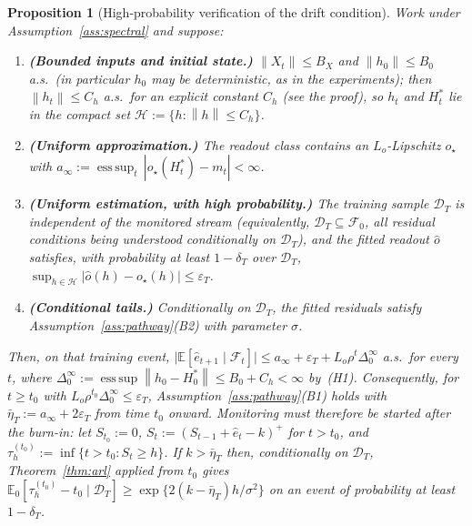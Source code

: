 \documentclass[bj,authoryear]{imsart}
\theoremstyle{plain}
\newtheorem{proposition}[theorem]{Proposition}
\theoremstyle{definition}
\newcommand{\E}{\mathbb{E}}
\newcommand{\F}{\mathcal{F}}
\newcommand{\norm}[1]{\left\lVert #1 \right\rVert}
\newcommand{\given}{\mid}
\begin{document}
\begin{proposition}[High-probability verification of the drift condition]
\label{prop:hp-drift}
  Work under Assumption~\ref{ass:spectral} and suppose:
  \begin{enumerate}[label=(H\arabic*), itemsep=2pt]
    \item \textbf{(Bounded inputs and initial state.)}  $\norm{X_t}\le B_X$ and
      $\norm{h_0}\le B_0$ a.s.\ (in particular $h_0$ may be deterministic, as in
      the experiments); then $\norm{h_t}\le C_h$ a.s.\ for an explicit constant
      $C_h$ (see the proof), so $h_t$ and $H_t^*$ lie in the compact set
      $\mathcal H:=\{h:\norm{h}\le C_h\}$.
    \item \textbf{(Uniform approximation.)}  The readout class contains an
      $L_o$-Lipschitz $o_\star$ with
      $a_\infty:=\operatorname*{ess\,sup}_t\,|o_\star(H_t^*)-m_t|<\infty$.
    \item \textbf{(Uniform estimation, with high probability.)}  The training
      sample $\mathcal D_T$ is independent of the monitored stream (equivalently,
      $\mathcal D_T\subseteq\F_0$, all residual conditions being understood
      conditionally on $\mathcal D_T$), and the fitted readout $\hat o$
      satisfies, with probability at least $1-\delta_T$ over $\mathcal D_T$,
      $\sup_{h\in\mathcal H}|\hat o(h)-o_\star(h)|\le\varepsilon_T$.
    \item \textbf{(Conditional tails.)}  Conditionally on $\mathcal D_T$, the
      fitted residuals satisfy Assumption~\ref{ass:pathway}(B2) with parameter
      $\sigma$.
  \end{enumerate}
  Then, on that training event,
  $\bigl|\E[\hat e_{t+1}\given\F_t]\bigr|
   \le a_\infty+\varepsilon_T+L_o\rho^{t}\Delta_0^\infty$ a.s.\ for every $t$,
  where $\Delta_0^\infty:=\operatorname*{ess\,sup}\norm{h_0-H_0^*}\le B_0+C_h<\infty$
  by~(H1).
  Consequently, for $t\ge t_0$ with $L_o\rho^{t_0}\Delta_0^\infty\le\varepsilon_T$,
  Assumption~\ref{ass:pathway}(B1) holds with
  $\bar\eta_T:=a_\infty+2\varepsilon_T$ \emph{from time $t_0$ onward}.  Monitoring
  must therefore be started after the burn-in: let $S_{t_0}:=0$,
  $S_t:=(S_{t-1}+\hat e_t-k)^+$ for $t>t_0$, and
  $\tau_h^{(t_0)}:=\inf\{t>t_0:S_t\ge h\}$.  If $k>\bar\eta_T$ then,
  conditionally on $\mathcal D_T$, Theorem~\ref{thm:arl} applied from $t_0$ gives
  $\E_0[\tau_h^{(t_0)}-t_0\given\mathcal D_T]\ge\exp\{2(k-\bar\eta_T)h/\sigma^2\}$
  on an event of probability at least $1-\delta_T$.
\end{proposition}
\end{document}
